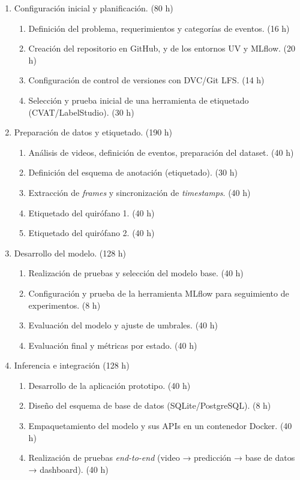 \documentclass[
11pt, %
]{charter}
\begin{document}
\begin{enumerate}
	\item Configuración inicial y planificación. (80 h)
	\begin{enumerate}
		\item Definición del problema, requerimientos y categorías de eventos. (16 h)
		\item Creación del repositorio en GitHub, y de los entornos UV y MLflow.  (20 h)
		\item Configuración de control de versiones con DVC/Git LFS. (14 h)
		\item Selección y prueba inicial de una herramienta de etiquetado (CVAT/LabelStudio). (30 h)
	\end{enumerate}
	
	\item Preparación de datos y etiquetado. (190 h)
	\begin{enumerate}
		\item Análisis de videos, definición de eventos, preparación del dataset. (40 h)
		\item Definición del esquema de anotación (etiquetado). (30 h)
		\item Extracción de \textit{frames} y sincronización de \textit{timestamps}. (40 h)
		\item Etiquetado del quirófano 1. (40 h)
		\item Etiquetado del quirófano 2.  (40 h)

	\end{enumerate}
	
	\item Desarrollo del modelo. (128 h)
	\begin{enumerate}
		\item Realización de pruebas y selección del modelo base. (40 h)
		\item Configuración y prueba de la herramienta MLflow para seguimiento de experimentos. (8 h)
		\item Evaluación del modelo y ajuste de umbrales. (40 h)
		\item Evaluación final y métricas por estado. (40 h)
	\end{enumerate}
	
	\item Inferencia e integración (128 h)
	\begin{enumerate}
		\item Desarrollo de la aplicación prototipo. (40 h)
		\item Diseño del esquema de base de datos (SQLite/PostgreSQL). (8 h)
		\item Empaquetamiento del modelo y sus APIs en un contenedor Docker. (40 h)
		\item Realización de pruebas\textit{ end-to-end }(video → predicción → base de datos → dashboard). (40 h)
	\end{enumerate}
	

\end{enumerate}
\end{document}
